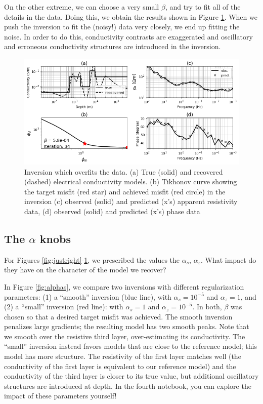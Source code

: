 \documentclass[11pt,oneside]{article}
\begin{document}
On the other extreme, we can choose a very small $\beta$, and try to fit all of the details in the data. Doing this, we obtain the results shown in Figure \ref{fig:overfit}. When we push the inversion to fit the (noisy!) data very closely, we end up fitting the noise. In order to do this, conductivity contrasts are exaggerated and oscillatory and erroneous conductivity structures are introduced in the inversion.



\begin{figure}[htb!]
    \centering
    \includegraphics[width=\textwidth]{images/overfit.png}
\caption{Inversion which overfits the data. (a) True (solid) and recovered (dashed) electrical conductivity models. (b) Tikhonov curve showing the target misfit (red star) and achieved misfit (red circle) in the inversion (c) observed (solid) and predicted (x’s) apparent resistivity data, (d) observed (solid) and predicted (x’s) phase data}
\label{fig:overfit}
\end{figure}
\subsection{The $\alpha$ knobs}

For Figures \ref{fig:justright}-\ref{fig:overfit}, we prescribed the values the $\alpha_s$, $\alpha_z$. What impact do they have on the character of the model we recover?

In Figure \ref{fig:alphas}, we compare two inversions with different regularization parameters: (1) a ``smooth'' inversion (blue line), with $\alpha_s = 10^{-5}$ and $\alpha_z = 1$, and (2) a ``small'' inversion (red line): with $\alpha_s = 1$ and $\alpha_z = 10^{-5}$. In both, $\beta$ was chosen so that a desired target misfit was achieved. The smooth inversion penalizes large gradients; the resulting model has two smooth peaks. Note that we smooth over the resistive third layer, over-estimating its conductivity. The ``small'' inversion instead favors models that are close to the reference model; this model has more structure. The resistivity of the first layer matches well (the conductivity of the first layer is equivalent to our reference model) and the conductivity of the third layer is closer to its true value, but additional oscillatory structures are introduced at depth. In the fourth notebook, you can explore the impact of these parameters yourself!
\end{document}

